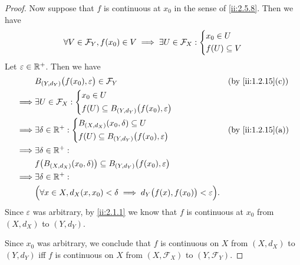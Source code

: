 \begin{proof}
  Now suppose that \(f\) is continuous at \(x_0\) in the sense of \cref{ii:2.5.8}.
  Then we have
  \[
    \forall V \in \mathcal{F}_Y, f(x_0) \in V \implies \exists U \in \mathcal{F}_X : \begin{dcases}
      x_0 \in U \\
      f(U) \subseteq V
    \end{dcases}
  \]
  Let \(\varepsilon \in \mathbb{R}^+\).
  Then we have
  \begin{align*}
             & B_{(Y, d_Y)}\big(f(x_0), \varepsilon\big) \in \mathcal{F}_Y                                       &  & \by{ii:1.2.15}[c] \\
    \implies & \exists U \in \mathcal{F}_X : \begin{dcases}
                                               x_0 \in U \\
                                               f(U) \subseteq B_{(Y, d_Y)}\big(f(x_0), \varepsilon\big)
                                             \end{dcases}                                    \\
    \implies & \exists \delta \in \R^+ : \begin{dcases}
                                           B_{(X, d_X)}(x_0, \delta) \subseteq U \\
                                           f(U) \subseteq B_{(Y, d_Y)}\big(f(x_0), \varepsilon\big)
                                         \end{dcases}                                          &  & \by{ii:1.2.15}[a]                   \\
    \implies & \exists \delta \in \R^+ :                                                                                                \\
             & f\big(B_{(X, d_X)}(x_0, \delta)\big) \subseteq B_{(Y, d_Y)}\big(f(x_0), \varepsilon\big)                                 \\
    \implies & \exists \delta \in \R^+ :                                                                                                \\
             & \Big(\forall x \in X, d_X(x, x_0) < \delta \implies d_Y\big(f(x), f(x_0)\big) < \varepsilon\Big).
  \end{align*}
  Since \(\varepsilon\) was arbitrary, by \cref{ii:2.1.1} we know that \(f\) is continuous at \(x_0\) from \((X, d_X)\) to \((Y, d_Y)\).

  Since \(x_0\) was arbitrary, we conclude that \(f\) is continuous on \(X\) from \((X, d_X)\) to \((Y, d_Y)\) iff \(f\) is continuous on \(X\) from \((X, \mathcal{F}_X)\) to \((Y, \mathcal{F}_Y)\).
\end{proof}

